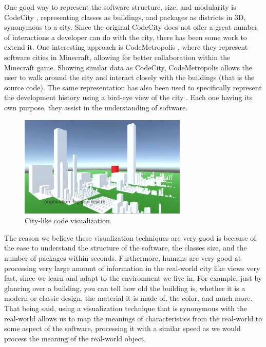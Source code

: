 \documentclass[conference]{IEEEtran}
\begin{document}
One good way to represent the software structure, size, and modularity is CodeCity \cite{Wettel:2011:SSC:1985793.1985868}, representing classes as buildings, and packages as districts in 3D, synonymous to a city.
Since the original CodeCity does not offer a great number of interactions a developer can do with the city, there has been some work to extend it.
One interesting approach is CodeMetropolis \cite{6648194}, where they represent software cities in Minecraft, allowing for better collaboration within the Minecraft game.
Showing similar data as CodeCity, CodeMetropolis allows the user to walk around the city and interact closely with the buildings (that is the source code).
The same representation has also been used to specifically represent the development history using a bird-eye view of the city \cite{Steinbruckner:2010:RDH:1879211.1879239}.
Each one having its own purpose, they assist in the understanding of software.

\begin{figure}[h]
\centering
\includegraphics[width=8cm]{NewRocat.pdf}
\caption{City-like code visualization}
\label{figure:new-Rocat}
\end{figure}

The reason we believe these visualization techniques are very good is because of the ease to understand the structure of the software, the classes size, and the number of packages within seconds.
Furthermore, humans are very good at processing very large amount of information in the real-world city like views very fast, since we learn and adapt to the environment we live in.
For example, just by glancing over a building, you can tell how old the building is, whether it is a modern or classic design, the material it is made of, the color, and much more.
That being said, using a visualization technique that is synonymous with the real-world allows us to map the meanings of characteristics from the real-world to some aspect of the software, processing it with a similar speed as we would process the meaning of the real-world object.
\end{document}
